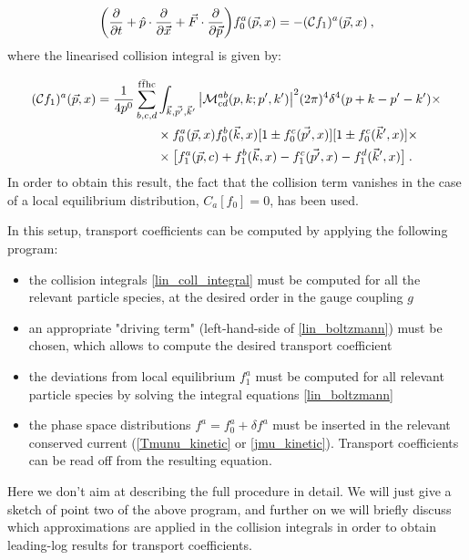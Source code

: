 \begin{equation}
\biggl( \frac{\partial  }{\partial t}+ \hat p \cdot \frac{\partial  }{\partial \vec x} + \vec F \cdot \frac{\partial  }{\partial \vec p} \biggr) f^a_0(\vec p,x)  =
- (\mathcal Cf_1)^a (\vec p, x) \: ,
\label{lin_boltzmann}
\end{equation}
%
where the linearised collision integral is given by:

\begin{equation}
\begin{split}
(\mathcal Cf_1)^a (\vec p, x) =  \frac{1}{4 p^0} \sum_{b,c,d}^{\mathrm{f \bar f h c}} &\int_{\vec k, \vec{p'}, \vec k'}  \abs{\mathcal M^{ab}_{cd}(p,k;p',k')}^2 (2 \pi)^4 \delta^4(p+k-p'-k') \times \\
&\times f_0^a(\vec p,x) f_0^b(\vec k,x)[1 \pm f_0^c(\vec{p'},x)][1 \pm f_0^c(\vec k', x)] \times \\
& \times \bigl[f_1^a(\vec p,c) + f_1^b(\vec k,x) - f_1^c(\vec{p'},x) - f_1^d(\vec k',x)\bigr] \: .
\end{split}
\label{lin_coll_integral}
\end{equation}
%
In order to obtain this result, the fact that the collision term vanishes in the case of a local equilibrium distribution, $C_a[f_0] = 0$, has been used.

In this setup, transport coefficients can be computed by applying the following program:

\begin{itemize}
\item the collision integrals \ref{lin_coll_integral} must be computed for all the relevant particle species, at the desired order in the gauge coupling $g$
\item an appropriate "driving term" (left-hand-side of \ref{lin_boltzmann}) must be chosen, which allows to compute the desired transport coefficient
\item the deviations from local equilibrium $f_1^a$ must be computed for all relevant particle species by solving the integral equations \ref{lin_boltzmann}
\item the phase space distributions $f^a = f^a_0 + \delta f^a$ must be inserted in the relevant conserved current (\ref{Tmunu_kinetic} or \ref{jmu_kinetic}). Transport coefficients can be read off from the resulting equation.
\end{itemize}
%
Here we don't aim at describing the full procedure in detail. We will just give a sketch of point two of the above program, and further on we will briefly discuss which approximations are applied in the collision integrals in order to obtain leading-log results for transport coefficients.

